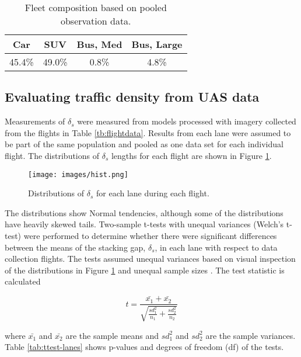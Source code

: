 \begin{table}[H]
\centering
\caption{Fleet composition based on pooled observation data.}
\label{tab:pooledfleet}
\begin{tabular}{cccc}
\toprule
\textbf{Car} & \textbf{SUV} & \textbf{Bus, Med} & \textbf{Bus, Large} \\ \midrule
45.4\% & 49.0\% & 0.8\% & 4.8\%\\ \bottomrule
\end{tabular}
\end{table}

\subsection{Evaluating traffic density from UAS data}

Measurements of $\delta_{s}$ were measured from models processed with imagery collected from the flights in Table \ref{tb:flightdata}.  Results from each lane were assumed to be part of the same population and pooled as one data set for each individual flight. The distributions of  $\delta_{s}$ lengths for each flight are shown in Figure \ref{fig:hist}.

\begin{figure}[H]
\centering
\texttt{[image: images/hist.png]} 
\caption{Distributions of $\delta_{s}$ for each lane during each flight.}
\label{fig:hist}
\end{figure}

The distributions show Normal tendencies, although some of the distributions have heavily skewed tails. Two-sample t-tests with unequal variances (Welch's t-test) were performed to determine whether there were significant differences between the means of the stacking gap, $\delta_{s}$, in each lane with respect to data collection flights. The tests assumed unequal variances based on visual inspection of the distributions in Figure \ref{fig:hist} and unequal sample sizes \citep{Rasch2011, Derrick2016}. The test statistic is calculated 

\begin{equation}
t = \frac{\bar{x_{1}}+\bar{x_{2}}}{\sqrt{\frac{sd^{2}_{1}}{n_{1}} + \frac{sd^{2}_{2}}{n_{2}} }}
\end{equation}

\noindent
where $\bar{x_{1}}$ and $\bar{x_{2}}$ are the sample means and  $sd^{2}_{1}$ and $sd^{2}_{2}$ are the sample variances. Table \ref{tab:ttest-lanes} shows p-values and degrees of freedom (df) of the tests.

